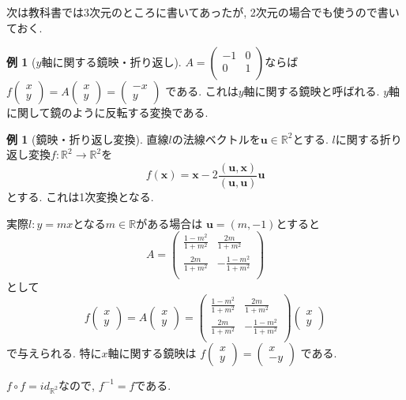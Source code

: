 \documentclass[dvipdfmx,a4paper,11pt]{article} %
\newcommand{\R}{\mathbb{R}}
\theoremstyle{definition}
\newtheorem{exa}[thm]{例}
\begin{document}
次は教科書では3次元のところに書いてあったが, 2次元の場合でも使うので書いておく. 
 \begin{exa}[$y$軸に関する鏡映・折り返し]
$
A=\begin{pmatrix}
-1& 0 \\
0& 1 \\
\end{pmatrix}
$ならば
$
f\begin{pmatrix}
x \\ y
 \end{pmatrix} 
 =
 A
\begin{pmatrix}
x \\ y
 \end{pmatrix}  = 
 \begin{pmatrix}
-x \\y
 \end{pmatrix}
$
である. これは$y$軸に関する鏡映と呼ばれる. $y$軸に関して鏡のように反転する変換である. 
\end{exa}

 \begin{exa}[鏡映・折り返し変換]
直線$l$の法線ベクトルを$\bm{u} \in \R^2$とする. 
$l$に関する折り返し変換$f : \R^2 \to \R^2$を
$$
f(\bm{x})
=
\bm{x} - 2 \frac{(\bm{u}, \bm{x})}{(\bm{u}, \bm{u})} \bm{u}
$$
 とする. これは1次変換となる. 
 
 実際$l : y=mx$となる$m \in \R$がある場合は
 $\bm{u}=(m, -1)$とすると
$$A=\begin{pmatrix}
\frac{1-m^2}{1+m^2}& \frac{2m}{1+m^2} \\
\frac{2m}{1+m^2}  & -\frac{1-m^2}{1+m^2} \\
\end{pmatrix}
$$
として
$$
f\begin{pmatrix}
x \\ y
 \end{pmatrix} 
 =
 A
\begin{pmatrix}
x \\ y
 \end{pmatrix}  
 =
\begin{pmatrix}
\frac{1-m^2}{1+m^2}& \frac{2m}{1+m^2} \\
\frac{2m}{1+m^2}  & -\frac{1-m^2}{1+m^2} \\
\end{pmatrix} 
\begin{pmatrix}
x \\ y
 \end{pmatrix}  
$$
で与えられる. 
特に$x$軸に関する鏡映は
$
f\begin{pmatrix}
x \\ y
 \end{pmatrix} 
 =
 \begin{pmatrix}
x \\-y
 \end{pmatrix}
$
である. 

$f \circ f = id_{\R^2}$なので, $f^{-1}=f$である. 
\end{exa}
\end{document}
